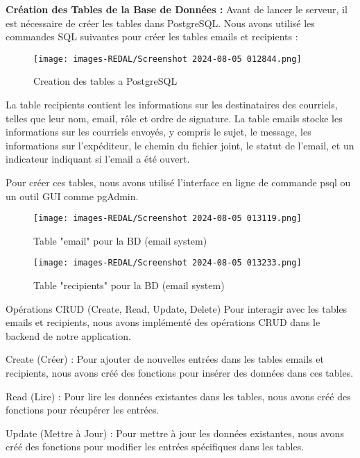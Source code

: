 \textbf{Création des Tables de la Base de Données :}
Avant de lancer le serveur, il est nécessaire de créer les tables dans PostgreSQL. Nous avons utilisé les commandes SQL suivantes pour créer les tables emails et recipients :

\begin{figure}[H]
\begin{center}
\texttt{[image: images-REDAL/Screenshot 2024-08-05 012844.png]}
\end{center}
\caption{Creation des tables a PostgreSQL}
\end{figure}


La table recipients contient les informations sur les destinataires des courriels, telles que leur nom, email, rôle et ordre de signature. La table emails stocke les informations sur les courriels envoyés, y compris le sujet, le message, les informations sur l'expéditeur, le chemin du fichier joint, le statut de l'email, et un indicateur indiquant si l'email a été ouvert.

Pour créer ces tables, nous avons utilisé l'interface en ligne de commande psql ou un outil GUI comme pgAdmin.


\begin{figure}[H]
\begin{center}
\texttt{[image: images-REDAL/Screenshot 2024-08-05 013119.png]}
\end{center}
\caption{Table "email" pour la BD (email system)}
\end{figure}


\begin{figure}[H]
\begin{center}
\texttt{[image: images-REDAL/Screenshot 2024-08-05 013233.png]}
\end{center}
\caption{Table "recipients" pour la BD (email system)}
\end{figure}


Opérations CRUD (Create, Read, Update, Delete)
Pour interagir avec les tables emails et recipients, nous avons implémenté des opérations CRUD dans le backend de notre application.

Create (Créer) :
Pour ajouter de nouvelles entrées dans les tables emails et recipients, nous avons créé des fonctions pour insérer des données dans ces tables.


Read (Lire) :
Pour lire les données existantes dans les tables, nous avons créé des fonctions pour récupérer les entrées.

Update (Mettre à Jour) :
Pour mettre à jour les données existantes, nous avons créé des fonctions pour modifier les entrées spécifiques dans les tables.


